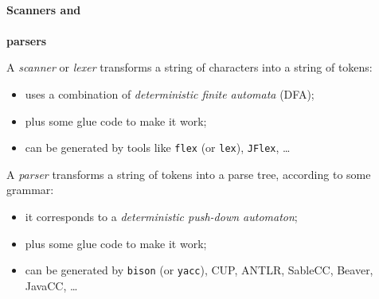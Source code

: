 




\begin{slide*}
\begin{tabbing}
~\\
{\Huge\bf Scanners and}\\ ~\\ {\Huge\bf parsers}\\
\end{tabbing}

\begin{center}
\end{center}

\vfil
\end{slide*}

\begin{slide*}
A {\em scanner\/} or {\em lexer} transforms a string of characters into a string
of tokens:
\begin{itemize}
\item uses a combination of {\em deterministic finite automata} (DFA);
\item plus some glue code to make it work;
\item can be generated by tools like {\tt flex} (or {\tt lex}), {\tt JFlex}, \ldots 
\end{itemize}
\vspace*{1em}

\vfil
\end{slide*}

\begin{slide*}
A {\em parser\/} transforms a string of tokens into a parse tree, according to some
grammar:
\begin{itemize}
\item it corresponds to a {\em deterministic push-down automaton};
\item plus some glue code to make it work;
\item can be generated by {\tt bison} (or {\tt yacc}), CUP, ANTLR, SableCC,
Beaver, JavaCC, \ldots
\end{itemize}
\vspace*{1em}

\vfil
\end{slide*}


